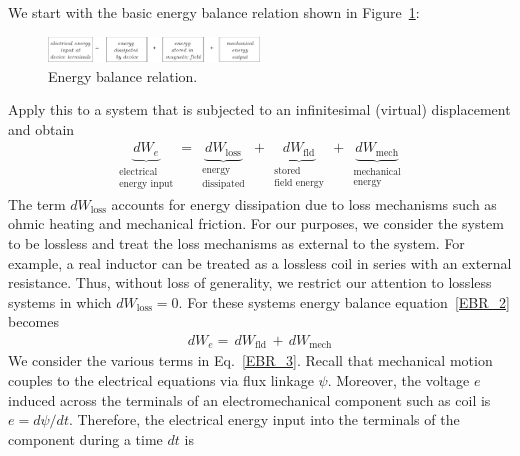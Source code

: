\documentclass[11pt,a4paper,oneside]{book}
\numberwithin{equation}{section}
\theoremstyle{it}
\theoremstyle{definition}
\begin{document}
We start with the basic energy balance relation shown in Figure~\ref{EBR_1}:
\begin{figure}[H]
	\centering
	\includegraphics[width = 0.5\textwidth, width = 400pt, angle = 0, keepaspectratio]{figures/energy_balance.eps}
	\captionsetup{width=0.75\textwidth}		
	\caption{Energy balance relation.}
	\label{EBR_1}
\end{figure}
Apply this to a system that is subjected to an infinitesimal (virtual) displacement and obtain
   \begin{equation}\label{EBR_2}
	\begin{aligned}
		\underbrace{dW_e}_{\substack{\text{electrical} \\ \text{energy input}}}  = \,
		\underbrace{dW_{\text{loss}}}_{\substack{\text{energy} \\ \text{dissipated}}} \, + \,
		\underbrace{dW_{\text{fld}}}_{\substack{\text{stored} \\ \text{field energy}}} \, + \,
		\underbrace{dW_{\text{mech}}}_{\substack{\text{mechanical} \\ \text{energy}}}
	\end{aligned}
\end{equation} 
The term $dW_{\text{loss}}$ accounts for energy dissipation due to loss mechanisms such as ohmic heating and mechanical friction. For our purposes, we consider the system to be lossless and treat the loss mechanisms as external to the system. For example, a real inductor can be treated as a lossless coil in series with an external resistance. Thus, without loss of generality, we restrict our attention to lossless systems in which $dW_{\text{loss}}=0$. For these systems energy balance equation~\ref{EBR_2} becomes
   \begin{equation}\label{EBR_3}
	\begin{aligned}
		{dW_e}  = \,
		{dW_{\text{fld}}} \, + \,
		{dW_{\text{mech}}}
	\end{aligned}
\end{equation} 
We consider the various terms in Eq.~\eqref{EBR_3}. Recall that mechanical motion couples to the electrical equations via flux linkage $\psi$. Moreover, the voltage $e$ induced across the terminals of an electromechanical component such as coil is $e=d\psi/dt$. Therefore, the electrical energy input into the terminals of the component during a time $dt$ is
\end{document}
